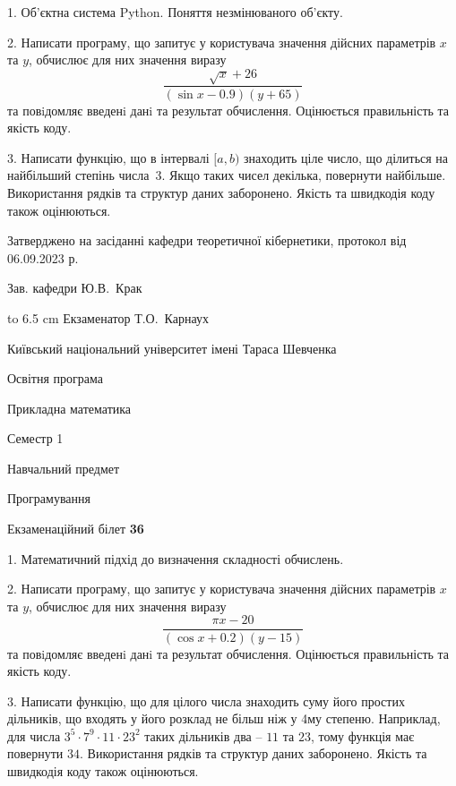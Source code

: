 \documentclass[12pt, ukrainian]{article}
\begin{document}
{%
1. Об’єктна система Python. Поняття незмінюваного об'єкту.%
\par
2. Написати програму, що запитує у користувача значення дійсних параметрів $x$ та $y$, обчислює для них значення виразу 
$$\frac{\sqrt x + 26}{(\sin x - 0.9) (y + 65)}$$ 
та повiдомляє введенi данi та результат обчислення.
 Оцінюється правильність та якість коду.

\par
3. Написати функцію, що в інтервалі $[a, b)$ знаходить ціле число, що ділиться на найбільший степінь числа 3. Якщо таких чисел декілька, повернути найбільше.  Використання рядків та структур даних заборонено. Якість та швидкодія коду також оцінюються. 

}
{\smallskip\smallskip \begin {scriptsize} Затверджено на засіданні кафедри теоретичної кібернетики, протокол   від   06.09.2023 р.\par\smallskip\smallskip\smallskip\smallskip
{\parbox {6.5 cm} {Зав. кафедри \dotfill Ю.В.~Крак}}\hspace {0.7cm} {\hbox to 6.5 cm { Екзаменатор \dotfill Т.О.~Карнаух}} \end{scriptsize}}
\vspace{0.9cm}
{{\begin {scriptsize}\par
{ \center  Київський національний університет імені Тараса Шевченка \par}
{\parbox {5 cm}{Освітня програма \hfill}{\parbox {7 cm}{Прикладна математика\hfill}}\parbox {6 cm}{\hfill Семестр 1}}\par
{\parbox {5 cm} {Навчальний предмет \hfill}\parbox {7 cm}{Програмування \hfill}\parbox {6cm}{\hfill}\par}\vspace{-15pt} \end{scriptsize}}{\center Екзаменаційний білет \No \textbf { 36 }\par}}
{%
1. Математичний підхід до визначення складності обчислень.%
\par
2. Написати програму, що запитує у користувача значення дійсних параметрів $x$ та $y$, обчислює для них значення виразу 
$$\frac{\pi x - 20}{(\cos x + 0.2) (y - 15)}$$ 
та повiдомляє введенi данi та результат обчислення.
 Оцінюється правильність та якість коду.

\par
3. Написати функцію, що для цілого числа знаходить суму його простих дільників, що входять у його розклад не більш ніж у 4му степеню. Наприклад, для числа $3^5{\cdot}7^9{\cdot}11{\cdot}23^{2}$ таких дільників два – $11$ та $23$, тому функція має повернути $34$.  Використання рядків та структур даних заборонено. Якість та швидкодія коду також оцінюються. 

}
\end{document}
